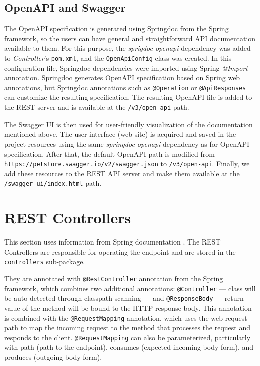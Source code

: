 \subsection{OpenAPI and Swagger}
The \hyperref[sec:openapi]{OpenAPI} specification is generated using Springdoc from the \hyperref[sec:spring]{Spring framework}, so the users can have general and straightforward API documentation available to them.
For this purpose, the \emph{sprigdoc-openapi} dependency was added to \emph{Controller}'s \texttt{pom.xml}, and the \texttt{OpenApiConfig} class was created. In this configuration file, Springdoc dependencies were imported using Spring \emph{@Import} annotation.
Springdoc generates OpenAPI specification based on Spring web annotations, but Springdoc annotations such as \texttt{@Operation} or \texttt{@ApiResponses} can customize the resulting specification.
The resulting OpenAPI file is added to the REST server and is available at the \texttt{/v3/open-api} path. \cite{springdoc}

The \hyperref[sec:swagger]{Swagger UI} is then used for user-friendly visualization of the documentation mentioned above.
The user interface (web site) is acquired and saved in the project resources using the same \emph{springdoc-openapi} dependency as for OpenAPI specification. After that, the default OpenAPI path is modified from \texttt{https://\-petstore.swagger.io\-/v2/swagger\-.json} to \texttt{/v3/open-api}. Finally, we add these resources to the REST API server and make them available at the  \texttt{/swagger-ui/index.html} path.

\section{REST Controllers}
This section uses information from Spring documentation \cite{springdocumentation}.
The REST Controllers are responsible for operating the endpoint and are stored in the \texttt{controllers} sub-package.

They are annotated with \texttt{@RestController} annotation from the Spring framework, which combines two additional annotations: \texttt{@Controller} --- class will be auto-detected through classpath scanning --- and \texttt{@ResponseBody} --- return value of the method will be bound to the HTTP response body.
This annotation is combined with the \texttt{@RequestMapping} annotation, which uses the web request path to map the incoming request to the method that processes the request and responds to the client. \texttt{@RequestMapping} can also be parameterized, particularly with path (path to the endpoint), consumes (expected incoming body form), and produces (outgoing body form).

